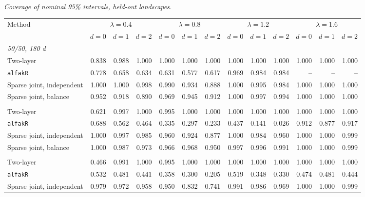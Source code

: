 \noindent\textit{Coverage of nominal 95\% intervals, held-out landscapes.}
\begin{center}
\scriptsize
\setlength{\tabcolsep}{2.5pt}
\begin{tabular}{l*{12}{r}}
\toprule
Method & \multicolumn{3}{c}{$\lambda=0.4$} & \multicolumn{3}{c}{$\lambda=0.8$} & \multicolumn{3}{c}{$\lambda=1.2$} & \multicolumn{3}{c}{$\lambda=1.6$} \\
\cmidrule(lr){2-4}\cmidrule(lr){5-7}\cmidrule(lr){8-10}\cmidrule(lr){11-13}
 & $d=0$ & $d=1$ & $d=2$ & $d=0$ & $d=1$ & $d=2$ & $d=0$ & $d=1$ & $d=2$ & $d=0$ & $d=1$ & $d=2$ \\
\midrule
\multicolumn{13}{l}{\textit{50/50, 180 d}} \\
\quad Two-layer & 0.838 & 0.988 & 1.000 & 1.000 & 1.000 & 1.000 & 1.000 & 1.000 & 1.000 & 1.000 & 1.000 & 1.000 \\
\quad \texttt{alfakR} & 0.778 & 0.658 & 0.634 & 0.631 & 0.577 & 0.617 & 0.969 & 0.984 & 0.984 & -- & -- & -- \\
\quad Sparse joint, independent & 1.000 & 1.000 & 0.998 & 0.990 & 0.934 & 0.888 & 1.000 & 0.995 & 0.984 & 1.000 & 1.000 & 1.000 \\
\quad Sparse joint, balance & 0.952 & 0.918 & 0.890 & 0.969 & 0.945 & 0.912 & 1.000 & 0.997 & 0.994 & 1.000 & 1.000 & 1.000 \\
\addlinespace[2pt]
\multicolumn{13}{l}{\textit{200/200, 180 d}} \\
\quad Two-layer & 0.621 & 0.997 & 1.000 & 0.995 & 1.000 & 1.000 & 1.000 & 1.000 & 1.000 & 1.000 & 1.000 & 1.000 \\
\quad \texttt{alfakR} & 0.688 & 0.562 & 0.464 & 0.335 & 0.297 & 0.233 & 0.437 & 0.141 & 0.026 & 0.912 & 0.877 & 0.917 \\
\quad Sparse joint, independent & 1.000 & 0.997 & 0.985 & 0.960 & 0.924 & 0.877 & 1.000 & 0.984 & 0.960 & 1.000 & 1.000 & 0.999 \\
\quad Sparse joint, balance & 1.000 & 0.987 & 0.973 & 0.966 & 0.968 & 0.950 & 0.997 & 0.996 & 0.991 & 1.000 & 1.000 & 0.999 \\
\addlinespace[2pt]
\multicolumn{13}{l}{\textit{200/200, 360 d}} \\
\quad Two-layer & 0.466 & 0.991 & 1.000 & 0.995 & 1.000 & 1.000 & 1.000 & 1.000 & 1.000 & 1.000 & 1.000 & 1.000 \\
\quad \texttt{alfakR} & 0.532 & 0.481 & 0.441 & 0.358 & 0.300 & 0.205 & 0.519 & 0.348 & 0.330 & 0.474 & 0.481 & 0.444 \\
\quad Sparse joint, independent & 0.979 & 0.972 & 0.958 & 0.950 & 0.832 & 0.741 & 0.991 & 0.986 & 0.969 & 1.000 & 1.000 & 0.999 \\

\end{tabular}
\end{center}
